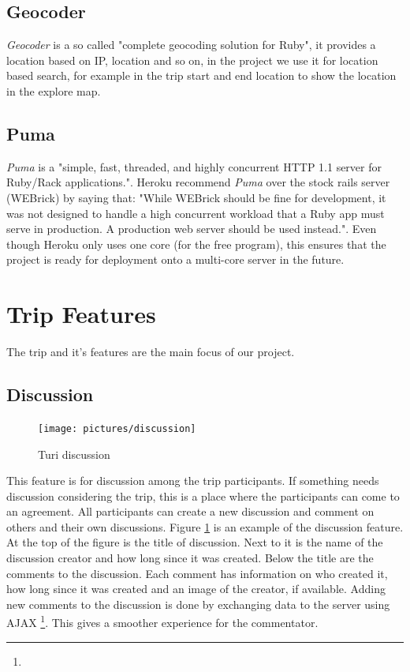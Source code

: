 \documentclass[a4paper]{article}
\begin{document}
\subsection{Geocoder}
\textit{Geocoder} is a so called "complete geocoding solution for Ruby"\cite{geocoder}, it provides a location based on IP, location and so on, in the project we use it for location based search, for example in the trip start and end location to show the location in the explore map. 

\subsection{Puma}
\textit{Puma} is a "simple, fast, threaded, and highly concurrent HTTP 1.1 server for Ruby/Rack applications."\cite{puma}. Heroku recommend \textit{Puma} over the stock rails server (WEBrick) by saying that: "While WEBrick should be fine for development, it was not designed to handle a high concurrent workload that a Ruby app must serve in production. A production web server should be used instead."\cite{heroku_webserver}. Even though Heroku only uses one core (for the free program), this ensures that the project is ready for deployment onto a multi-core server in the future.  


\section{Trip Features}
The trip and it's features are the main focus of our project. 
\subsection{Discussion}

\begin{figure}[!h]
  \begin{center}
    \vspace{-0pt}
    \texttt{[image: pictures/discussion]}
  \end{center}
\caption{Turi discussion}
\label{fig:discussion}
\end{figure}

This feature is for discussion among the trip participants. If something needs discussion considering the trip, this is a place where the participants can come to an agreement. All participants can create a new discussion and comment on others and their own discussions. Figure \ref{fig:discussion} is an example of the discussion feature. At the top of the figure is the title of discussion. Next to it is the name of the discussion creator and how long since it was created. Below the title are the comments to the discussion. Each comment has information on who created it, how long since it was created and an image of the creator, if available. Adding new comments to the discussion is done by exchanging data to the server using AJAX \footnote{\AJAX}. This gives a smoother experience for the commentator. 
\end{document}
